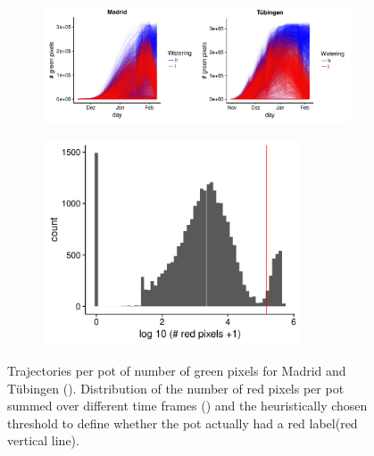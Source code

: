 \documentclass[12pt,]{article}
\begin{document}
\begin{figure}
    \centering
    \begin{subfigure}[t]{0.8\textwidth}
        \centering
        \includegraphics[width=6in]{../figs/Figure_green_trajectory.pdf}
        \caption{} \label{fig:growth}
    \end{subfigure}
        \begin{subfigure}[t]{0.8\textwidth}
        \centering
        \centerline{\includegraphics[width=3in]{../figs/Figure_redcount_histogram.pdf}}
        \caption{} \label{fig:red}
    \end{subfigure}
    \caption{Trajectories per pot of number of green pixels for Madrid and Tübingen (). Distribution of the number of red pixels per pot summed over different time frames () and the heuristically chosen threshold to define whether the pot actually had a red label(red vertical line).}
    \label{fig:pixels}
\end{figure}
\end{document}
